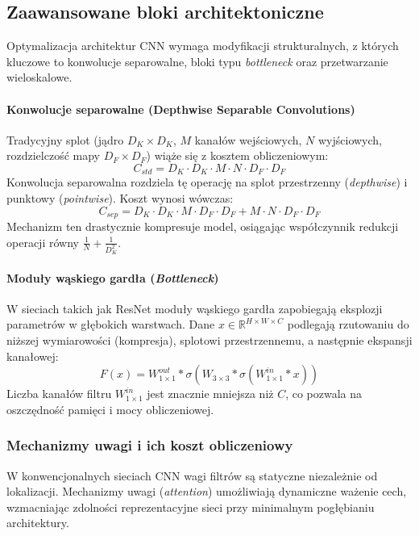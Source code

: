 \subsection{Zaawansowane bloki architektoniczne}
Optymalizacja architektur CNN wymaga modyfikacji strukturalnych, z których kluczowe to konwolucje separowalne, bloki typu \textit{bottleneck} oraz przetwarzanie wieloskalowe.

\paragraph{Konwolucje separowalne (Depthwise Separable Convolutions)}
Tradycyjny splot (jądro $D_K \times D_K$, $M$ kanałów wejściowych, $N$ wyjściowych, rozdzielczość mapy $D_F \times D_F$) wiąże się z kosztem obliczeniowym:
$$ C_{std} = D_K \cdot D_K \cdot M \cdot N \cdot D_F \cdot D_F $$
Konwolucja separowalna  rozdziela tę operację na splot przestrzenny (\textit{depthwise}) i punktowy (\textit{pointwise}). Koszt wynosi wówczas:
$$ C_{sep} = D_K \cdot D_K \cdot M \cdot D_F \cdot D_F + M \cdot N \cdot D_F \cdot D_F $$
Mechanizm ten drastycznie kompresuje model, osiągając współczynnik redukcji operacji równy $\frac{1}{N} + \frac{1}{D_K^2}$.

\paragraph{Moduły wąskiego gardła (\textit{Bottleneck})}
W sieciach takich jak ResNet  moduły wąskiego gardła zapobiegają eksplozji parametrów w głębokich warstwach. Dane $x \in \mathbb{R}^{H \times W \times C}$ podlegają rzutowaniu do niższej wymiarowości (kompresja), splotowi przestrzennemu, a następnie ekspansji kanałowej:
$$ F(x) = W_{1\times1}^{out} * \sigma\left( W_{3\times3} * \sigma\left( W_{1\times1}^{in} * x \right) \right) $$
Liczba kanałów filtru $W_{1\times1}^{in}$ jest znacznie mniejsza niż $C$, co pozwala na oszczędność pamięci i mocy obliczeniowej.

\subsubsection{Mechanizmy uwagi i ich koszt obliczeniowy}
W konwencjonalnych sieciach CNN wagi filtrów są statyczne niezależnie od lokalizacji. Mechanizmy uwagi (\textit{attention}) umożliwiają dynamiczne ważenie cech, wzmacniając zdolności reprezentacyjne sieci przy minimalnym pogłębianiu architektury.

